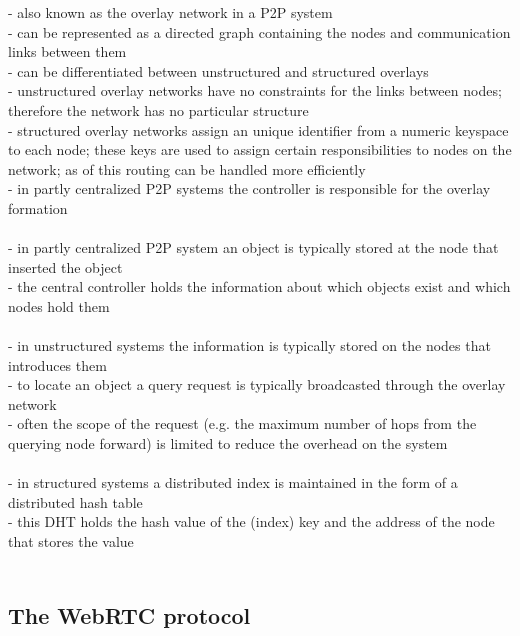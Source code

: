 - also known as the overlay network in a P2P system \\
- can be represented as a directed graph containing the nodes and communication links between them \\
- can be differentiated between unstructured and structured overlays \\
- unstructured overlay networks have no constraints for the links between nodes; therefore the network has no particular structure \\
- structured overlay networks assign an unique identifier from a numeric keyspace to each node; these keys are used to assign certain responsibilities to nodes
on the network; as of this routing can be handled more efficiently \\
- in partly centralized P2P systems the controller is responsible for the overlay formation \\
\\
- in partly centralized P2P system an object is typically stored at the node that inserted the object \\
- the central controller holds the information about which objects exist and which nodes hold them \\
\\
- in unstructured systems the information is typically stored on the nodes that introduces them \\
- to locate an object a query request is typically broadcasted through the overlay network \\
- often the scope of the request (e.g. the maximum number of hops from the querying node forward) is limited to reduce the overhead on the system \\
\\
- in structured systems a distributed index is maintained in the form of a distributed hash table \\
- this DHT holds the hash value of the (index) key and the address of the node that stores the value \\
\\


\subsection{The \gls{WebRTC} protocol}
\label{sec:p2p_webrtc}



